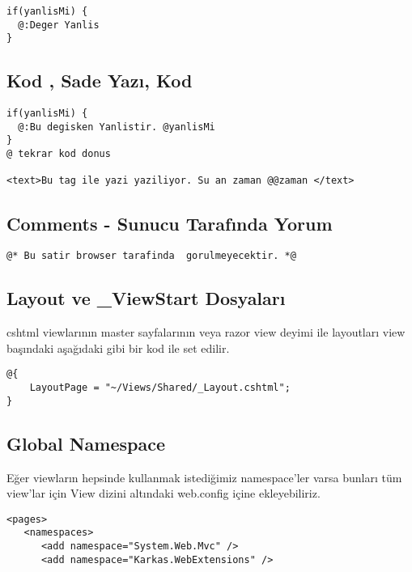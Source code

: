 \documentclass[10pt,a4paper]{article}
\begin{document}
\begin{lstlisting}[label=code-TextAndMarkup3,caption=Yazı ve Markup 3 @:]
if(yanlisMi) {
  @:Deger Yanlis
}
\end{lstlisting}





\subsection{Kod , Sade Yazı, Kod}

\begin{lstlisting}[label=code-TextAndMarkup,caption=Yazı ve Markup]
if(yanlisMi) {
  @:Bu degisken Yanlistir. @yanlisMi
}
@ tekrar kod donus

<text>Bu tag ile yazi yaziliyor. Su an zaman @@zaman </text>
\end{lstlisting}


\subsection{Comments - Sunucu Tarafında Yorum}

\begin{lstlisting}[label=code-Comment,caption=Comment - Yorum]
@* Bu satir browser tarafinda  gorulmeyecektir. *@
\end{lstlisting}


\subsection{Layout ve \_ViewStart Dosyaları}
cshtml viewlarının master sayfalarının veya razor view deyimi ile layoutları
view başındaki aşağıdaki gibi bir kod ile set edilir.

\begin{lstlisting}[label=code-Layout,caption=Layout - Düzenleme]
@{
	LayoutPage = "~/Views/Shared/_Layout.cshtml";
}
\end{lstlisting}




\subsection{Global Namespace}
Eğer viewların hepsinde kullanmak istediğimiz namespace'ler varsa bunları tüm view'lar için View dizini altındaki web.config
içine ekleyebiliriz.

\begin{lstlisting}[label=code-GlobalNamespace,caption=Global Namespace Ekleme]
<pages>
   <namespaces>
      <add namespace="System.Web.Mvc" />
      <add namespace="Karkas.WebExtensions" />
\end{lstlisting}
\end{document}
